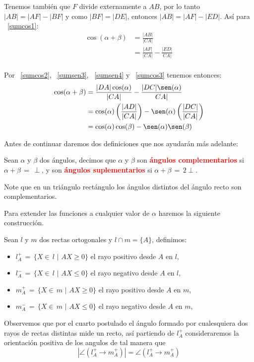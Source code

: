 \begin{pba}
Tenemos también que $F$ divide externamente a $AB$, por lo tanto $|AB|=|AF|-|BF|$ y como $|BF|=|DE|$, entonces $|AB|=|AF|-|ED|$. 
Así para ~\ref{sumcos1}:
\begin{align*}
\cos(\alpha + \beta) 
&=  \frac{|AB|}{|CA|}\\
&= \frac{|AF|}{|CA|} - \frac{|ED|}{CA|}\\
\end{align*}  
  
Por ~\ref{sumcos2}, ~\ref{sumsen3}, ~\ref{sumsen4} y ~\ref{sumcos3} tenemos entonces:
\begin{align*}
\cos(\alpha + \beta) 
&= \frac{|DA|\cos(\alpha)}{|CA|} - \frac{|DC|\sen(\alpha)}{CA|}\\
&=\cos(\alpha)\left(\frac{|AD|}{|CA|}\right) - \sen(\alpha)\left(\frac{|DC|}{|CA|}\right)\\
&=\cos(\alpha)\cos(\beta) - \sen(\alpha)\sen(\beta)\\ 
\end{align*}  
\end{pba}

Antes de continuar daremos dos definiciones que nos ayudarán más adelante:
\begin{df}
Sean $\alpha$ y $\beta$ dos ángulos, decimos que $\alpha$ y $\beta$ son \textcolor{red}{\bf ángulos  complementarios} si $\alpha+\beta\,=\,\perp$, y son \textcolor{red}{\bf ángulos suplementarios} si   $\alpha+\beta\,=\,2\perp$.

Note que en un triángulo rectángulo los ángulos distintos del ángulo recto son complementarios.
\end{df}

Para extender las funciones a cualquier valor de $\alpha$ haremos la siguiente construcción.
\begin{df}
Sean $l$ y $m$ dos rectas ortogonales y $l\cap m = \{A\}$, definimos:
\begin{itemize}
\item $l_{A}^{+} \,=\,\{X\in\, l \,\, | \,\, AX \geq 0\}$ el rayo positivo desde $A$ en $l$,
\item $l_{A}^{-} \,=\,\{X\in\, l \,\, | \,\, AX \leq 0\}$ el rayo negativo desde $A$ en $l$,
\item $m_{A}^{+} \,=\,\{X\in\, m \,\, | \,\, AX \geq 0\}$ el rayo positivo desde $A$ en $m$,
\item $m_{A}^{-} \,=\,\{X\in\, m \,\, | \,\, AX \leq 0\}$ el rayo negativo desde $A$ en $m$,
\end{itemize}
Observemos que por el cuarto postulado el ángulo formado por cualesquiera dos rayos de rectas distintas mide un recto, así partiendo de $l_{A}^{+}$ consideraremos la orientación positiva de los angulos de tal manera que \[|\angle( l_{A}^{+} \rightarrow m_{A}^{+})| = \angle (l_{A}^{+} \rightarrow m_{A}^{+})\]
\end{df}

